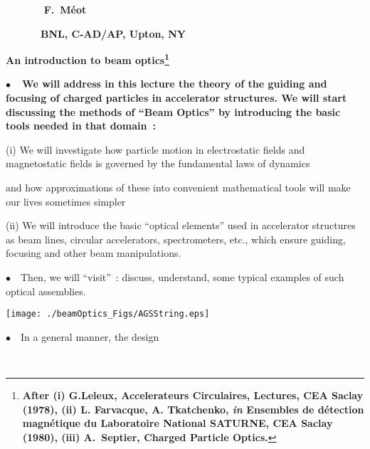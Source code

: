 \documentclass[12pt]{paper}
\newcommand{\nib}{\noindent $\bullet$~}
\newcommand{\blue}{\color{blue}}
\begin{document}
\landscape


\sffamily


  
{
 ~~~~~~~ \hfill \large   \bf F.~M\'eot 

~~~~~~~\hfill \large   \bf BNL, C-AD/AP, Upton, NY
}

\begin{center} 
\Huge  
\bf An introduction to beam optics\footnote{\large \bf After (i) G.Leleux, Accelerateurs Circulaires, Lectures, CEA Saclay (1978), 
(ii) L. Farvacque, A. Tkatchenko, \textsl{in} Ensembles de d\'etection magn\'etique du Laboratoire National SATURNE,  CEA Saclay (1980), (iii) A.~Septier, Charged Particle Optics.}
\end{center} 


{\blue   \Large \bf
\nib\ We will address in this lecture  the theory of the  guiding and focusing of charged particles in accelerator structures. 
We will start discussing the methods of ``Beam Optics'' by  introducing the basic tools  needed in that domain~: 



(i) We will investigate how particle motion in electrostatic fields and magnetostatic fields is governed by the fundamental 
laws of dynamics 



and how  approximations of these into convenient  mathematical  tools will make our lives sometimes simpler 



(ii) We will introduce the basic ``optical elements'' used in accelerator structures as beam lines, circular 
accelerators, spectrometers, etc.,  which ensure guiding, focusing and other beam manipulations. 



\nib\ Then, we will ``visit''~: discuss, understand, some typical examples of such optical assemblies. 
}


\begin{center}
\texttt{[image: ./beamOptics\_Figs/AGSString.eps]}
\end{center}



\clearpage

\tableofcontents




\clearpage

\nib\ In a general manner, the design  

~
\end{document}
